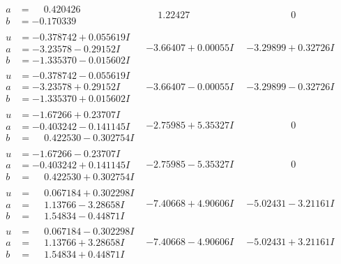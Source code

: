 \documentclass[1p]{elsarticle_modified}
\theoremstyle{definition}
\begin{document}
$$\begin{array}{c|c|c}
\begin{aligned}
a &= \phantom{-}0.420426\phantom{ +0.000000I} \\
b &= -0.170339\phantom{ +0.000000I}\end{aligned}
 & \phantom{-}1.22427\phantom{ +0.000000I} & \phantom{-0.000000 } 0 \\ \hline\begin{aligned}
u &= -0.378742 + 0.055619 I \\
a &= -3.23578 - 0.29152 I \\
b &= -1.335370 - 0.015602 I\end{aligned}
 & -3.66407 + 0.00055 I & -3.29899 + 0.32726 I \\ \hline\begin{aligned}
u &= -0.378742 - 0.055619 I \\
a &= -3.23578 + 0.29152 I \\
b &= -1.335370 + 0.015602 I\end{aligned}
 & -3.66407 - 0.00055 I & -3.29899 - 0.32726 I \\ \hline\begin{aligned}
u &= -1.67266 + 0.23707 I \\
a &= -0.403242 - 0.141145 I \\
b &= \phantom{-}0.422530 - 0.302754 I\end{aligned}
 & -2.75985 + 5.35327 I & \phantom{-0.000000 } 0 \\ \hline\begin{aligned}
u &= -1.67266 - 0.23707 I \\
a &= -0.403242 + 0.141145 I \\
b &= \phantom{-}0.422530 + 0.302754 I\end{aligned}
 & -2.75985 - 5.35327 I & \phantom{-0.000000 } 0 \\ \hline\begin{aligned}
u &= \phantom{-}0.067184 + 0.302298 I \\
a &= \phantom{-}1.13766 - 3.28658 I \\
b &= \phantom{-}1.54834 - 0.44871 I\end{aligned}
 & -7.40668 + 4.90606 I & -5.02431 - 3.21161 I \\ \hline\begin{aligned}
u &= \phantom{-}0.067184 - 0.302298 I \\
a &= \phantom{-}1.13766 + 3.28658 I \\
b &= \phantom{-}1.54834 + 0.44871 I\end{aligned}
 & -7.40668 - 4.90606 I & -5.02431 + 3.21161 I \\ \hline\begin{aligned}

\end{aligned}
\end{array}$$
\end{document}
